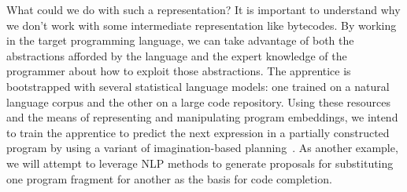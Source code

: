 What could we do with such a representation? It is important to understand why we don’t work with some intermediate representation like bytecodes. By working in the target programming language, we can take advantage of both the abstractions afforded by the language and the expert knowledge of the programmer about how to exploit those abstractions. The apprentice is bootstrapped with several statistical language models: one trained on a natural language corpus and the other on a large code repository. Using these resources and the means of representing and manipulating program embeddings, we intend to train the apprentice to predict the next expression in a partially constructed program by using a variant of imagination-based planning~\cite{PascanuetalCoRR-17}. As another example, we will attempt to leverage NLP methods to generate proposals for substituting one program fragment for another as the basis for code completion. 


\setcounter{figure}{54}


